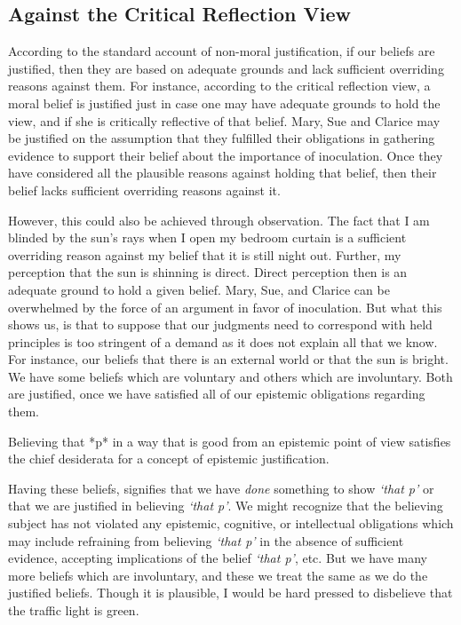 \documentclass[
  12pt,
]{book}
\newenvironment{Shaded}{\begin{snugshade}}{\end{snugshade}}
\newcommand{\NormalTok}[1]{#1}
\theoremstyle{definition}
\theoremstyle{definition}
\theoremstyle{definition}
\theoremstyle{definition}
\theoremstyle{remark}
\begin{document}
\subsection*{Against the Critical Reflection View}\label{against-the-critical-reflection-view-1}

According to the standard account of non-moral justification, if our beliefs are justified, then they are based on adequate grounds and lack sufficient overriding reasons against them. For instance, according to the critical reflection view, a moral belief is justified just in case one may have adequate grounds to hold the view, and if she is critically reflective of that belief. Mary, Sue and Clarice may be justified on the assumption that they fulfilled their obligations in gathering evidence to support their belief about the importance of inoculation. Once they have considered all the plausible reasons against holding that belief, then their belief lacks sufficient overriding reasons against it.

However, this could also be achieved through observation. The fact that I am blinded by the sun's rays when I open my bedroom curtain is a sufficient overriding reason against my belief that it is still night out. Further, my perception that the sun is shinning is direct. Direct perception then is an adequate ground to hold a given belief. Mary, Sue, and Clarice can be overwhelmed by the force of an argument in favor of inoculation. But what this shows us, is that to suppose that our judgments need to correspond with held principles is too stringent of a demand as it does not explain all that we know. For instance, our beliefs that there is an external world or that the sun is bright. We have some beliefs which are voluntary and others which are involuntary. Both are justified, once we have satisfied all of our epistemic obligations regarding them.

\begin{Shaded}
\begin{Highlighting}[]

\NormalTok{Believing that *p* in a way that is good from an epistemic point of view satisfies the chief desiderata for a concept of epistemic justification.}
\end{Highlighting}
\end{Shaded}

Having these beliefs, signifies that we have \emph{done} something to show \emph{`that p'} or that we are justified in believing \emph{`that p'}. We might recognize that the believing subject has not violated any epistemic, cognitive, or intellectual obligations which may include refraining from believing \emph{`that p'} in the absence of sufficient evidence, accepting implications of the belief \emph{`that p'}, etc. But we have many more beliefs which are involuntary, and these we treat the same as we do the justified beliefs. Though it is plausible, I would be hard pressed to disbelieve that the traffic light is green.
\end{document}
